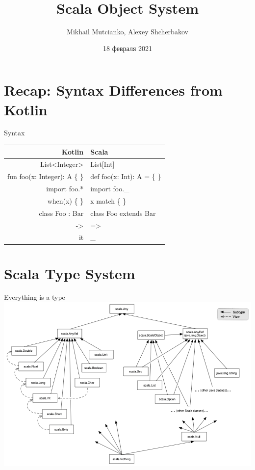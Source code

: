 \documentclass[aspectratio=169]{beamer}
\title{Scala Object System}
\author{Mikhail Mutcianko, Alexey Shcherbakov}
\institute{СПБгУ, СП}
\date{18 февраля 2021}
\begin{document}
\frame{\titlepage}

\section{Recap: Syntax Differences from Kotlin}

\begin{frame}{Syntax}
  \centering
  \begin{tabular}{>{\ttfamily}r@{\ $\Leftrightarrow$\ }>{\ttfamily}l}
    Kotlin & Scala \\
    \hline
    \pause
    List<Integer> & List[Int] \\
    \pause
    fun foo(x: Integer): A \{ \} & def foo(x: Int): A = \{  \} \\
    \pause
    import foo.* & import foo.\_ \\
    \pause
    when(x) \{  \} & x match \{  \} \\
    \pause
    class Foo : Bar & class Foo extends Bar \\
    \pause
    -> & => \\
    \pause
    it & \_
  \end{tabular}
\end{frame}

\section{Scala Type System}

\begin{frame}{Everything is a type}
  \centering
  \includegraphics[scale=0.35]{classhierarchy.png}
\end{frame}
\end{document}
